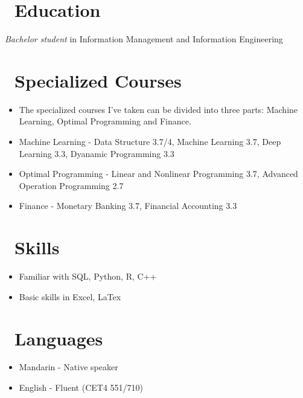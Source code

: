 \documentclass{resume}
\begin{document}



\section{\faGraduationCap\ Education}
\textit{Bachelor student} in Information Management and Information Engineering

\section{\faUsers\ Specialized Courses}
\begin{itemize}[parsep=0.5ex]
  \item The specialized courses I've taken can be divided into three parts: Machine Learning, Optimal Programming and Finance.
  \item Machine Learning - Data Structure 3.7/4, Machine Learning 3.7, Deep Learning 3.3, Dyanamic Programming 3.3
  \item Optimal Programming - Linear and Nonlinear Programming 3.7, Advanced Operation Programming 2.7
  \item Finance - Monetary Banking 3.7, Financial Accounting 3.3
\end{itemize}
  
\section{\faCogs\ Skills}
\begin{itemize}[parsep=0.5ex]
  \item Familiar with SQL, Python, R, C++
  \item Basic skills in Excel, LaTex
\end{itemize}

\section{\faInfo\ Languages}
\begin{itemize}[parsep=0.5ex]
  \item Mandarin - Native speaker
  \item English - Fluent (CET4 551/710)
\end{itemize}

%
%
\end{document}
